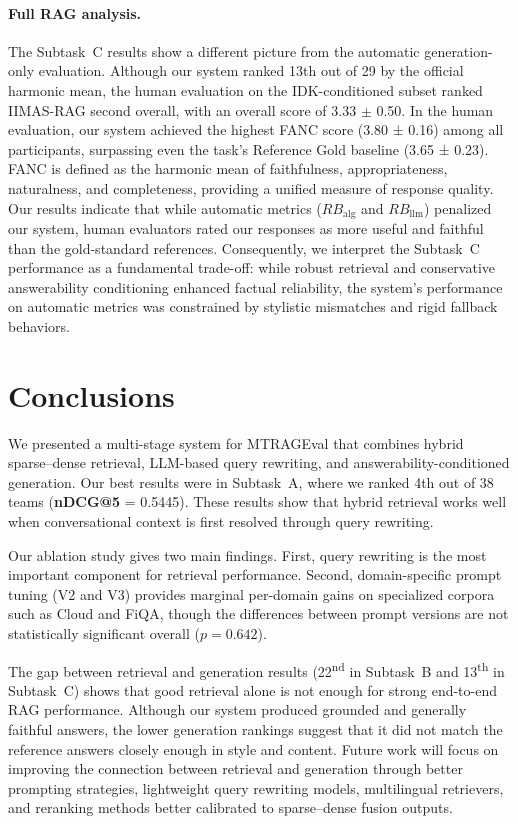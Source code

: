 \documentclass[11pt]{article}
\begin{document}
\paragraph{Full RAG analysis.}
The Subtask~C results show a different picture from the automatic generation-only evaluation. Although our system ranked 13th out of 29 by the official harmonic mean, the human evaluation on the IDK-conditioned subset ranked IIMAS-RAG second overall, with an overall score of 3.33 $\pm$ 0.50. In the human evaluation, our system achieved the highest FANC score (3.80 ± 0.16) among all participants, surpassing even the task's Reference Gold baseline (3.65 ± 0.23). FANC is defined as the harmonic mean of faithfulness, appropriateness, naturalness, and completeness, providing a unified measure of response quality. Our results indicate that while automatic metrics ($RB_{\text{alg}}$ and $RB_{\text{llm}}$) penalized our system, human evaluators rated our responses as more useful and faithful than the gold-standard references. Consequently, we interpret the Subtask~C performance as a fundamental trade-off: while robust retrieval and conservative answerability conditioning enhanced factual reliability, the system's performance on automatic metrics was constrained by stylistic mismatches and rigid fallback behaviors.



\section{Conclusions}

We presented a multi-stage system for MTRAGEval that combines hybrid sparse--dense retrieval, LLM-based query rewriting, and answerability-conditioned generation. Our best results were in Subtask~A, where we ranked 4th out of 38 teams (\textbf{nDCG@5} = 0.5445). These results show that hybrid retrieval works well when conversational context is first resolved through query rewriting.

Our ablation study gives two main findings. First, query rewriting is the most important component for retrieval performance. Second, domain-specific prompt tuning (V2 and V3) provides marginal per-domain gains on specialized corpora such as Cloud and FiQA, though the differences between prompt versions are not statistically significant overall ($p = 0.642$).

The gap between retrieval and generation results (22\textsuperscript{nd} in Subtask~B and 13\textsuperscript{th} in Subtask~C) shows that good retrieval alone is not enough for strong end-to-end RAG performance. Although our system produced grounded and generally faithful answers, the lower generation rankings suggest that it did not match the reference answers closely enough in style and content. Future work will focus on improving the connection between retrieval and generation through better prompting strategies, lightweight query rewriting models, multilingual retrievers, and reranking methods better calibrated to sparse--dense fusion outputs.
\end{document}
